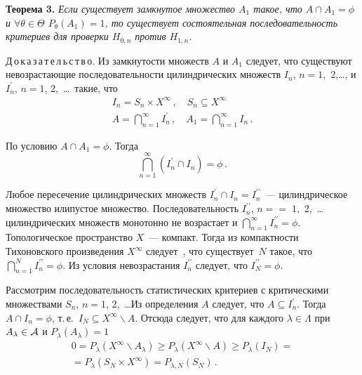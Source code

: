 \begin{multicols}{2}
    \medskip
    
    \noindent
    \textbf{Теорема 3.} \textit{Если существует замкнутое множество $A_1$ 
такое, что $A\cap A_1=\phi$ и $\forall\theta\in\Theta$ $P_\theta (A_1)=1$, то 
существует состоятельная последовательность критериев для проверки 
$H_{0,n}$ против $H_{1,n}$.}
    
    \smallskip
    
    \noindent
    Д\,о\,к\,а\,з\,а\,т\,е\,л\,ь\,с\,т\,в\,о. Из замкнутости множеств $A$ и $A_1$ 
следует, что существуют~\cite{5gr} невозрастающие последовательности 
цилиндрических множеств $I_n$, $n = 1$,\ 2,\ldots, и $I^\prime_n$, $n = 1$, 
2,\  \ldots\ такие, что
\begin{gather*}
I_n = S_n\times X^\infty\,,\quad S_n\subseteq X^\infty\\
A=\bigcap\limits_{n=1}^\infty I^\prime_n\,,\quad A_1=\bigcap\limits_{n=1}^\infty 
I_n\,.
\end{gather*}

    По условию $A\cap A_1=\phi$. Тогда
    $$
    \bigcap\limits_{n=1}^\infty \left ( I^\prime_n \cap I_n\right )=\phi\,.
$$

    Любое пересечение цилиндрических множеств $I^\prime_n\cap 
I_n=I_n^{\prime\prime}$~--- цилиндрическое множество или\linebreak пустое множество. 
Последовательность $I_n^{\prime\prime}$, $n =$\linebreak $=\;1,$ 2,\ \ldots цилиндрических 
множеств монотонно не возрастает и $\bigcap\limits_{n=1}^\infty 
I_n^{\prime\prime}=\phi$. Топологическое пространство $X$~--- компакт. Тогда 
из компактности Тихоновского произведения $X^\infty$ следует~\cite{4gr}, что 
существует~$N$ такое, что $\bigcap\limits_{n=1}^N I_n^{\prime\prime}=\phi$. Из 
условия невозрастания $I_n^{\prime\prime}$ следует, что $I_N^{\prime\prime} 
=\phi$. 
    
    Рассмотрим последовательность статистических критериев с 
критическими множествами $S_n$, $n = 1$, 2,\ \ldots Из определения $A$ 
следует, что $A\subseteq I_n^\prime$. Тогда $A\cap I_n=\phi$, т.\,е.\ 
$I_N\subseteq X^\infty \backslash A$. Отсюда следует, что для каждого $\lambda 
\in \Lambda$ при $A_\lambda \in \cal{A}$  и $P_\lambda (A_\lambda )=1$
    \begin{multline*}
    0 = P_\lambda \left ( X^\infty \backslash  A_\lambda \right ) \geq
    P_\lambda \left ( X^\infty\backslash A\right ) \geq P_\lambda \left (I_N\right ) ={}\\
    {}=
    P_\lambda \left ( S_N\times X^\infty\right ) = P_{\lambda,N}(S_N)\,.
    \end{multline*}


\end{multicols}
